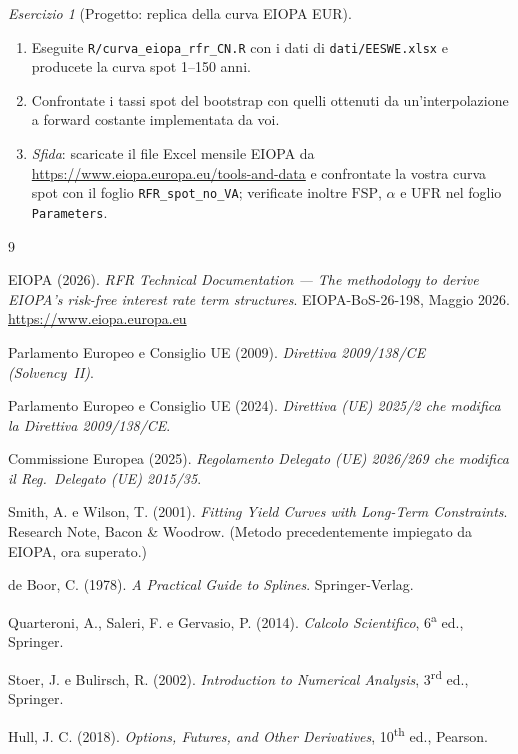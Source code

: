 \documentclass[11pt,a4paper]{article}
\theoremstyle{plain}
\theoremstyle{definition}
\theoremstyle{remark}
\newtheorem{esercizio}{Esercizio}[section]
\newcommand{\FSP}{\mathrm{FSP}}
\begin{document}
\begin{esercizio}[Progetto: replica della curva EIOPA EUR]
\begin{enumerate}[label=(\alph*)]
  \item Eseguite \texttt{R/curva\_eiopa\_rfr\_CN.R} con i dati di
        \texttt{dati/EESWE.xlsx} e producete la curva spot 1--150 anni.
  \item Confrontate i tassi spot del bootstrap con quelli ottenuti da
        un'interpolazione a forward costante implementata da voi.
  \item \emph{Sfida}: scaricate il file Excel mensile EIOPA da
        \url{https://www.eiopa.europa.eu/tools-and-data} e confrontate la vostra curva
        spot con il foglio \texttt{RFR\_spot\_no\_VA}; verificate inoltre $\FSP$,
        $\alpha$ e UFR nel foglio \texttt{Parameters}.
\end{enumerate}
\end{esercizio}

\renewcommand{\refname}{Riferimenti bibliografici}
\begin{thebibliography}{9}

EIOPA (2026).
\textit{RFR Technical Documentation --- The methodology to derive EIOPA's risk-free
interest rate term structures}.
EIOPA-BoS-26-198, Maggio 2026.
\url{https://www.eiopa.europa.eu}

Parlamento Europeo e Consiglio UE (2009).
\textit{Direttiva 2009/138/CE (Solvency~II)}.

Parlamento Europeo e Consiglio UE (2024).
\textit{Direttiva (UE) 2025/2 che modifica la Direttiva 2009/138/CE}.

Commissione Europea (2025).
\textit{Regolamento Delegato (UE) 2026/269 che modifica il Reg.\ Delegato (UE) 2015/35}.

Smith, A. e Wilson, T. (2001).
\textit{Fitting Yield Curves with Long-Term Constraints}.
Research Note, Bacon \& Woodrow. (Metodo precedentemente impiegato da EIOPA, ora superato.)

de Boor, C. (1978).
\textit{A Practical Guide to Splines}.
Springer-Verlag.

Quarteroni, A., Saleri, F. e Gervasio, P. (2014).
\textit{Calcolo Scientifico}, 6\textsuperscript{a} ed., Springer.

Stoer, J. e Bulirsch, R. (2002).
\textit{Introduction to Numerical Analysis}, 3\textsuperscript{rd} ed., Springer.

Hull, J. C. (2018).
\textit{Options, Futures, and Other Derivatives}, 10\textsuperscript{th} ed., Pearson.

\end{thebibliography}
\end{document}
